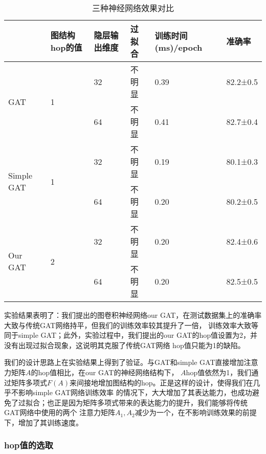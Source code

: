 \begin{table}[]
    \centering
    \caption{三种神经网络效果对比}
    \begin{tabular}{|l|l|l|l|l|l|}
    \hline
                                & 图结构hop的值           & 隐层输出维度 & 过拟合 & 训练时间(ms)/epoch & 准确率      \\ \hline
    \multirow{2}{*}{GAT}        & \multirow{2}{*}{1} & 32     & 不明显 & 0.39           & 82.2±0.5 \\ \cline{3-6} 
                                &                    & 64     & 不明显 & 0.41           & 82.7±0.4 \\ \hline
    \multirow{2}{*}{Simple GAT} & \multirow{2}{*}{1} & 32     & 不明显 & 0.19           & 80.1±0.3 \\ \cline{3-6} 
                                &                    & 64     & 不明显 & 0.20           & 80.2±0.5 \\ \hline
    \multirow{2}{*}{Our GAT}    & \multirow{2}{*}{2} & 32     & 不明显 & 0.20           & 82.4±0.6 \\ \cline{3-6} 
                                &                    & 64     & 不明显 & 0.20           & 82.5±0.5 \\ \hline
    \end{tabular}
\end{table}

实验结果表明了：我们提出的图卷积神经网络our GAT，在测试数据集上的准确率大致与传统GAT网络持平，但我们的训练效率较其提升了一倍，
训练效率大致等同于simple GAT；此外，实验过程中，我们提出的our GAT的hop值设置为2，并没有出现过拟合现象，这说明其克服了传统GAT网络
hop值只能为1的缺陷。

我们的设计思路上在实验结果上得到了验证。与GAT和simple GAT直接增加注意力矩阵$A$的hop值相比，在our GAT的神经网络结构下，
$A$hop值依然为1，我们通过矩阵多项式$ F(A) $来间接地增加图结构的hop。正是这样的设计，使得我们在几乎不影响simple GAT网络训练效率
的情况下，大大增加了其表达能力，也成功避免了过拟合；也正是因为矩阵多项式带来的表达能力的提升，我们能够将传统GAT网络中使用的两个
注意力矩阵$ A_1,A_2 $减少为一个，在不影响训练效果的前提下，增加了其训练速度。

\subsubsection{hop值的选取}

